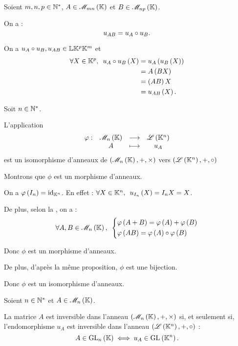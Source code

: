 \begin{prop}
Soient \(m,n,p\in\mathbb{N}^*\), \(A\in\M{mn}\) et \(B\in\M{np}\).

On a : \[u_{AB}=u_A\circ u_B.\]
\end{prop}

\begin{dem}
On a \(u_A\circ u_B,u_{AB}\in\mathbb{L}{\mathbb{K}^p}{\mathbb{K}^m}\) et \[\begin{aligned}
\quantifs{\forall X\in\K^p}u_A\rond u_B\paren{X}&=u_A\paren{u_B\paren{X}} \\
&=A\paren{BX} \\
&=\paren{AB}X \\
&=u_{AB}\paren{X}.
\end{aligned}\]
\end{dem}

\begin{prop}
Soit \(n\in\mathbb{N}^*\).

L'application \[\fonction{\phi}{\M{n}}{\Lendo{\K^n}}{A}{u_A}\] est un isomorphisme d'anneaux de \(\anneau{\M{n}}\) vers \(\anneau{\Lendo{\K^n}}[+][\rond]\)
\end{prop}

\begin{dem}
Montrons que \(\phi\) est un morphisme d'anneaux.

On a \(\varphi\left(I_n\right)=\mathrm{id}_{\mathbb{K}^n}\). En effet : \(\quantifs{\forall X\in\K^n}u_{I_n}\paren{X}=I_nX=X\).

De plus, selon la , on a : \[\quantifs{\forall A,B\in\M{n}}\begin{dcases}
\phi\paren{A+B}=\phi\paren{A}+\phi\paren{B} \\
\phi\paren{AB}=\phi\paren{A}\rond\phi\paren{B}
\end{dcases}\]

Donc \(\phi\) est un morphisme d'anneaux.

De plus, d'après la même proposition, \(\phi\) est une bijection.

Donc \(\phi\) est un isomorphisme d'anneaux.
\end{dem}

\begin{prop}
Soient \(n\in\mathbb{N}^*\) et \(A\in\M{n}\).

La matrice \(A\) est inversible dans l'anneau \(\anneau{\M{n}}\) si, et seulement si, l'endomorphisme \(u_A\) est inversible dans l'anneau \(\anneau{\Lendo{\K^n}}[+][\rond]\) : \[A\in\GL{n}\ssi u_A\in\GL{}[\K^n].\]
\end{prop}

